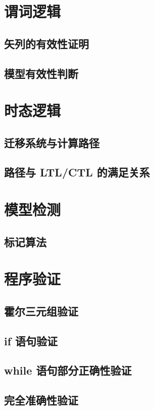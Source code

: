 \documentclass[cn, hazy, blue, normal, 12pt]{elegantnote}
\begin{document}
\section{谓词逻辑}

\subsection{矢列的有效性证明}



\subsection{模型有效性判断}



\section{时态逻辑}

\subsection{迁移系统与计算路径}



\subsection{路径与 LTL/CTL 的满足关系}



\section{模型检测}

\subsection{标记算法}



\section{程序验证}

\subsection{霍尔三元组验证}



\subsection{if 语句验证}



\subsection{while 语句部分正确性验证}



\subsection{完全准确性验证}
\end{document}
